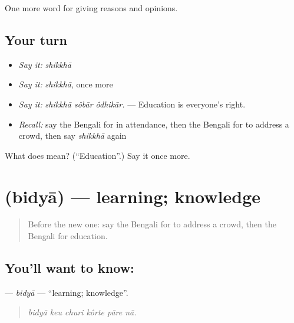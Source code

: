 \begin{grammarlens}[title={What you've built}]
One more word for giving reasons and opinions.
\end{grammarlens}

\subsection*{Your turn}
\begin{itemize}
\raggedright
  \item \emph{Say it:} \emph{shikkhā}
  \item \emph{Say it:} \emph{shikkhā}, once more
  \item \emph{Say it:} \emph{shikkhā sôbār ôdhikār.} — Education is everyone's right.
  \item \emph{Recall:} say the Bengali for in attendance, then the Bengali for to address a crowd, then say \emph{shikkhā} again
\end{itemize}

\begin{tcolorbox}[breakable,colback=teal!4,colframe=teal!35!black,title={Before you move on}]
What does  mean? (\textquotedblleft{}Education\textquotedblright{}.) Say it once more.
\end{tcolorbox}
\section[\texorpdfstring{\bn{বিদ্যা} (bidyā)}{বিদ্যা (bidyā)}]{ (bidyā) — learning; knowledge}

\label{lesson:BN-C361-bidya}



\begin{quote}
Before the new one: say the Bengali for to address a crowd, then the Bengali for education.
\end{quote}

\subsection*{You'll want to know: }
\textbf{} — \emph{bidyā} — \textquotedblleft{}learning; knowledge\textquotedblright{}.

\begin{quote}
     
\end{quote}

\begin{quote}
\emph{bidyā keu churi kôrte pāre nā.}
\end{quote}

